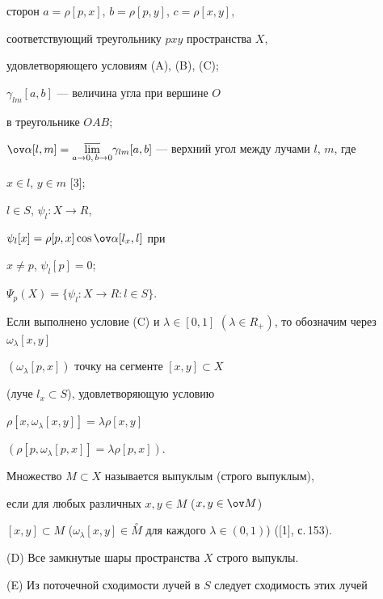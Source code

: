 сторон $a = \rho [p,x]$, $b =\rho [p,y]$, $c=\rho [x,y]$,


соответствующий треугольнику $pxy$ пространства $X$,


удовлетворяющего условиям (A), (B), (C);


$\gamma_{lm}[a,b]$ --- величина угла при вершине $O$ 


в треугольнике  $OAB$;


$\ov \alpha[l,m]=\underset{a \rightarrow 0, \, b \rightarrow 0}{\varlimsup}{}


{\gamma_{lm}[a,b]} $ --- верхний угол между лучами $l$, $m$, где


$x \in l$, $y \in m$ [3];


$l \in S$, $\psi _{l} : X \rightarrow R$,


$\psi _{l}[x] = \rho[p,x]\cos \ov \alpha[l_{x},l]$ при


$x\neq p$, $\psi_{l}[p] = 0$;


$\Psi_{p}(X) = \{\psi _{l} : X \rightarrow R : l \in S \}$. 





Если выполнено условие (C) и $\lambda \in [0,1]$ $(\lambda \in


R_{+})$, то обозначим через $\omega_{\lambda}[x,y]$


$(\omega_{\lambda}[p,x])$ точку на сегменте $[x,y] \subset X$


(луче $l_{x} \subset S$), удовлетворяющую условию


$\rho [x,\omega_{\lambda}[x,y]] = \lambda\rho [x,y]$


$(\rho [p,\omega_{\lambda}[p,x]] = \lambda\rho [p,x])$. 





Множество $M \subset  X$ называется выпуклым (строго выпуклым),


если для любых различных $x, y \in M$ ($x, y \in \ov M$)


$[x,y] \subset M$ ($\omega_{\lambda}[x,y] \in \overset{\circ}


{M}$ для каждого $\lambda \in (0,1)$) ([1], с.\,153).





(D) Все замкнутые шары пространства $X$ строго выпуклы.





(E) Из поточечной сходимости лучей в $S$ следует сходимость этих лучей



